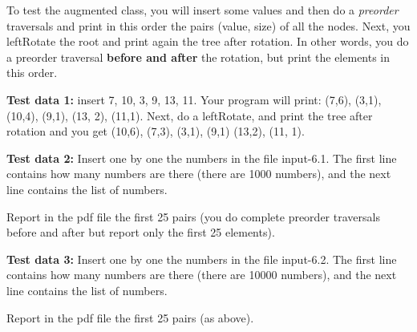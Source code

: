 \documentclass[11pt]{article}
\begin{document}
To test the augmented class, you will insert some values and then do a \emph{preorder} traversals and print in this order  the pairs (value, size) of all the nodes. 	Next, you \textsf{leftRotate} the root and print again the tree after rotation. In other words, you do a preorder traversal \textbf{before and after} the rotation, but print the elements in this order.

\textbf{Test data 1:} insert 7, 10, 3, 9, 13, 11. Your program will print: (7,6), (3,1), (10,4), (9,1), (13, 2), (11,1).
Next, do a \textsf{leftRotate}, and print the tree after rotation and you get (10,6), (7,3), (3,1), (9,1) (13,2), (11, 1).




\textbf{Test data 2:}  Insert one by one the numbers in the file input-6.1. The first line contains how many numbers are there (there are 1000 numbers), and the next line contains the list of numbers.

Report in the pdf file the first 25 pairs (you do complete preorder traversals before and after but report only the first 25 elements).

\textbf{Test data 3:} Insert one by one the numbers in the file input-6.2. The first line contains how many numbers are there (there are 10000 numbers), and the next line contains the list of numbers.

Report in the pdf file the first 25 pairs (as above).
\end{document}
